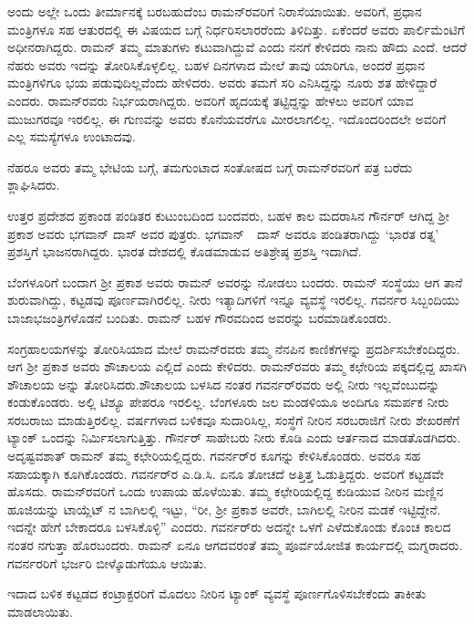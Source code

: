 ಅಂದು ಅಲ್ಲೇ ಒಂದು ತೀರ್ಮಾನಕ್ಕೆ ಬರಬಹುದೆಂಬ ರಾಮನ್‍ರವರಿಗೆ ನಿರಾಸೆಯಾಯಿತು. ಅವರಿಗೆ, ಪ್ರಧಾನ ಮಂತ್ರಿಗಳೂ ಸಹ ಆತುರದಲ್ಲಿ ಈ ವಿಷಯದ ಬಗ್ಗೆ ನಿರ್ಧರಿಸಲಾರರೆಂದು ತಿಳಿದಿತ್ತು. ಏಕೆಂದರೆ ಅವರು ಪಾರ್ಲಿಮೆಂಟಿಗೆ ಅಧೀನರಾಗಿದ್ದರು. ರಾಮನ್ ತಮ್ಮ ಮಾತುಗಳು ಕಟುವಾಗಿದ್ದುವೆ ಎಂದು ನನಗೆ ಕೇಳಿದರು ನಾನು ಹೌದು ಎಂದೆ. ಆದರೆ ನೆಹರು ಅವರು ಇದನ್ನು ತೋರಿಸಿಕೊಳ್ಳಲಿಲ್ಲ. ಬಹಳ ದಿನಗಳಾದ ಮೇಲೆ ತಾವು ಯಾರಿಗೂ, ಅಂದರೆ ಪ್ರಧಾನ ಮಂತ್ರಿಗಳಿಗೂ ಭಯ ಪಡುವುದಿಲ್ಲವೆಂದು ಹೇಳಿದರು. ಅವರು ತಮಗೆ ಸರಿ ಎನಿಸಿದ್ದನ್ನು ನೂರು ಶತ ಹೇಳಿದ್ದಾರೆ ಎಂದರು. ರಾಮನ್‍ರವರು ನಿರ್ಭಯರಾಗಿದ್ದರು. ಅವರಿಗೆ ಹೃದಯಕ್ಕೆ ತಟ್ಟಿದ್ದನ್ನು ಹೇಳಲು ಅವರಿಗೆ ಯಾವ ಮುಜುಗರವೂ ಇರಲಿಲ್ಲ. ಈ ಗುಣವನ್ನು ಅವರು ಕೊನೆಯವರೆಗೂ ಮೀರಲಾಗಲಿಲ್ಲ. ಇದೊಂದರಿಂದಲೇ ಅವರಿಗೆ ಎಲ್ಲ ಸಮಸ್ಯೆಗಳೂ ಉಂಟಾದವು.

ನೆಹರೂ ಅವರು ತಮ್ಮ ಭೇಟಿಯ ಬಗ್ಗೆ, ತಮಗುಂಟಾದ ಸಂತೋಷದ ಬಗ್ಗೆ ರಾಮನ್‍ರವರಿಗೆ ಪತ್ರ ಬರೆದು ಶ್ಲಾಘಿಸಿದರು.



ಉತ್ತರ ಪ್ರದೇಶದ ಪ್ರಕಾಂಡ ಪಂಡಿತರ ಕುಟುಂಬದಿಂದ ಬಂದವರು, ಬಹಳ ಕಾಲ ಮದರಾಸಿನ ಗೌರ್ನರ್ ಆಗಿದ್ದ ಶ‍್ರೀ ಪ್ರಕಾಶ ಅವರು ಭಗವಾನ್ ದಾಸ್ ಅವರ ಪುತ್ರರು. ಭಗವಾನ್~~ದಾಸ್ ಅವರೂ ಪಂಡಿತರಾಗಿದ್ದು ‘ಭಾರತ ರತ್ನ’ ಪ್ರಶಸ್ತಿಗೆ ಭಾಜನರಾಗಿದ್ದರು. ಭಾರತ ದೇಶದಲ್ಲಿ ಕೊಡಮಾಡುವ ಅತಿಶ್ರೇಷ್ಠ ಪ್ರಶಸ್ತಿ ಇದಾಗಿದೆ.

ಬೆಂಗಳೂರಿಗೆ ಬಂದಾಗ ಶ‍್ರೀ ಪ್ರಕಾಶ ಅವರು ರಾಮನ್ ಅವರನ್ನು ನೋಡಲು ಬಂದರು. ರಾಮನ್ ಸಂಸ್ಥೆಯು ಆಗ ತಾನೆ ಶುರುವಾಗಿದ್ದು, ಕಟ್ಟಡವು ಪೂರ್ಣವಾಗಿರಲಿಲ್ಲ. ನೀರು ಇತ್ಯಾದಿಗಳಿಗೆ ಇನ್ನೂ ವ್ಯವಸ್ಥೆ ಇರಲಿಲ್ಲ. ಗವರ್ನರ ಸಿಬ್ಬಂದಿಯು ಬಾಜಾಭಜಂತ್ರಿಗಳೊಡನೆ ಬಂದಿತು. ರಾಮನ್ ಬಹಳ ಗೌರವದಿಂದ ಅವರನ್ನು ಬರಮಾಡಿಕೊಂಡರು.

ಸಂಗ್ರಹಾಲಯಗಳನ್ನು ತೋರಿಸಿಯಾದ ಮೇಲೆ ರಾಮನ್‍ರವರು ತಮ್ಮ ನೆನಪಿನ ಕಾಣಿಕೆಗಳನ್ನು ಪ್ರದರ್ಶಿಸಬೇಕೆಂದಿದ್ದರು. ಆಗ ಶ‍್ರೀ ಪ್ರಕಾಶ ಅವರು ಶೌಚಾಲಯ ಎಲ್ಲಿದೆ ಎಂದು ಕೇಳಿದರು. ರಾಮನ್‍ರವರು ತಮ್ಮ ಕಛೇರಿಯ ಪಕ್ಕದಲ್ಲಿದ್ದ ಖಾಸಗಿ ಶೌಚಾಲಯ ಅನ್ನು ತೋರಿಸಿದರು.\break ಶೌಚಾಲಯ ಬಳಸಿದ ನಂತರ ಗವರ್ನರ್‌ರವರು ಅಲ್ಲಿ ನೀರು ಇಲ್ಲವೆಂಬುದನ್ನು ಕಂಡುಕೊಂಡರು. ಅಲ್ಲಿ ಟಿಶ್ಯೂ ಪೇಪರೂ ಇರಲಿಲ್ಲ. ಬೆಂಗಳೂರು ಜಲ ಮಂಡಳಿಯೂ ಅಂದಿಗೂ ಸಮರ್ಪಕ ನೀರು ಸರಬರಾಜು ಮಾಡುತ್ತಿರಲಿಲ್ಲ.  ವರ್ಷಗಳಾದ ಬಳಿಕವೂ ಸುದಾರಿಸಿಲ್ಲ, ಸಂಸ್ಥೆಗೆ ನೀರಿನ ಸರಬರಾಜಿಗೆ ನೀರು ಶೇಖರಣೆಗೆ ಟ್ಯಾಂಕ್ ಒಂದನ್ನು ನಿರ್ಮಿಸಲಾಗುತ್ತಿತ್ತು. ಗೌರ್ನರ್ ಸಾಹೇಬರು ನೀರು ಕೊಡಿ ಎಂದು ಆರ್ತನಾದ ಮಾಡತೊಡಗಿದರು. ಅದೃಷ್ಟವಶಾತ್ ರಾಮನ್ ತಮ್ಮ ಕಛೇರಿಯಲ್ಲಿದ್ದರು. ಗವರ್ನರ್‌ರ ಕೂಗನ್ನು ಕೇಳಿಸಿಕೊಂಡರು. ಅವರೂ ಸಹ ಸಹಾಯಕ್ಕಾಗಿ ಕೂಗಿಕೊಂಡರು. ಗವರ್ನರ್‌ರ ಎ.ಡಿ.ಸಿ. ಏನೂ ತೋಚದೆ ಅತ್ತಿತ್ತ ಓಡುತ್ತಿದ್ದರು. ಅವರಿಗೆ ಕಟ್ಟಡವೇ ಹೊಸದು. ರಾಮನ್‍ರವರಿಗೆ ಒಂದು ಉಪಾಯ ಹೊಳೆಯಿತು. ತಮ್ಮ ಕಛೇರಿಯಲ್ಲಿದ್ದ ಕುಡಿಯುವ ನೀರಿನ ಮಣ್ಣಿನ ಹೂಜಿಯನ್ನು ಟಾಯ್ಲೆಟ್ ನ ಬಾಗಿಲಲ್ಲಿ ಇಟ್ಟು, “ರೀ, ಶ‍್ರೀ ಪ್ರಕಾಶ ಅವರೇ, ಬಾಗಿಲಲ್ಲಿ ನೀರಿನ ಮಡಕೆ ಇಟ್ಟಿದ್ದೇನೆ. ಇದನ್ನೇ ಹೇಗೆ ಬೇಕಾದರೂ ಬಳಸಿಕೊಳ್ಳಿ” ಎಂದರು. ಗವರ್ನರ್‌ರು ಅದನ್ನೇ ಒಳಗೆ ಎಳೆದುಕೊಂಡು ಕೊಂಚ ಕಾಲದ ನಂತರ ನಗುತ್ತಾ ಹೊರಬಂದರು. ರಾಮನ್ ಏನೂ ಆಗದವರಂತೆ ತಮ್ಮ ಪೂರ್ವಯೋಜಿತ ಕಾರ್ಯದಲ್ಲಿ ಮಗ್ನರಾದರು. ಗವರ್ನರರಿಗೆ ಭರ್ಜರಿ ಬೀಳ್ಕೊಡುಗೆಯೂ ಆಯಿತು.

ಇದಾದ ಬಳಿಕ ಕಟ್ಟಡದ ಕಂಟ್ರಾಕ್ಟರರಿಗೆ ಮೊದಲು ನೀರಿನ ಟ್ಯಾಂಕ್ ವ್ಯವಸ್ಥೆ ಪೂರ್ಣಗೊಳಿಸ\-ಬೇಕೆಂದು ತಾಕೀತು ಮಾಡಲಾಯಿತು.


